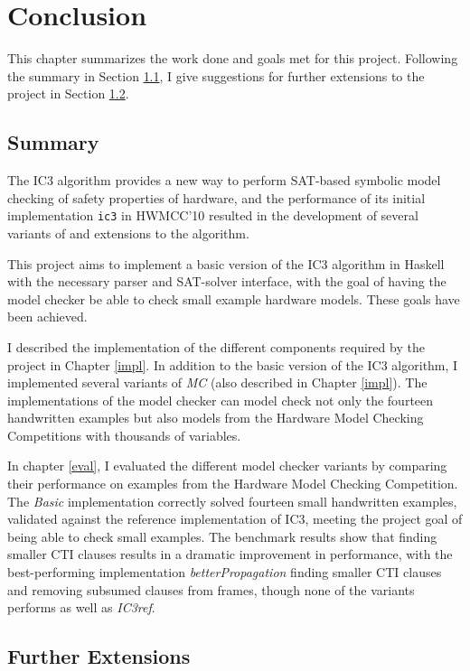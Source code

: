 \documentclass[12pt,a4paper,twoside,openright]{report}
\begin{document}
{\chapter{Conclusion}
\label{conc}

This chapter summarizes the work done and goals met for this project.
Following the summary in Section \ref{conc:summary}, I give
suggestions for further extensions to the project in Section \ref{conc:extensions}.

\section{Summary}
\label{conc:summary}

The IC3 algorithm provides a new way to perform SAT-based symbolic model checking of
safety properties of hardware, and the performance of its initial implementation
\verb,ic3, in HWMCC'10 resulted in the development of several variants of
and extensions to the algorithm.

This project aims to implement a basic version of the IC3 algorithm in Haskell with the
necessary parser and SAT-solver interface, with the goal of having the model checker
be able to check small example hardware models. These goals have been achieved.

I described the implementation of the different components required by
the project in Chapter \ref{impl}.
In addition to the basic version of the IC3 algorithm, I implemented several variants of
\emph{MC} (also described in Chapter \ref{impl}).
The implementations of the model checker can model check not only
the fourteen handwritten examples but also models from the
Hardware Model Checking Competitions with thousands of variables.

In chapter \ref{eval}, I evaluated the different model checker variants by comparing their performance on examples from
the Hardware Model Checking Competition.
The \emph{Basic} implementation correctly
solved fourteen small handwritten examples, validated against the reference implementation
of IC3, meeting the project goal of being able to check
small examples.
The benchmark results show that finding smaller CTI clauses
results in a dramatic improvement in performance, with the best-performing implementation
\emph{betterPropagation} finding smaller CTI clauses and removing subsumed clauses from frames,
though none of the variants performs as well as \emph{IC3ref}.

\section{Further Extensions}
\label{conc:extensions}

}
\end{document}
